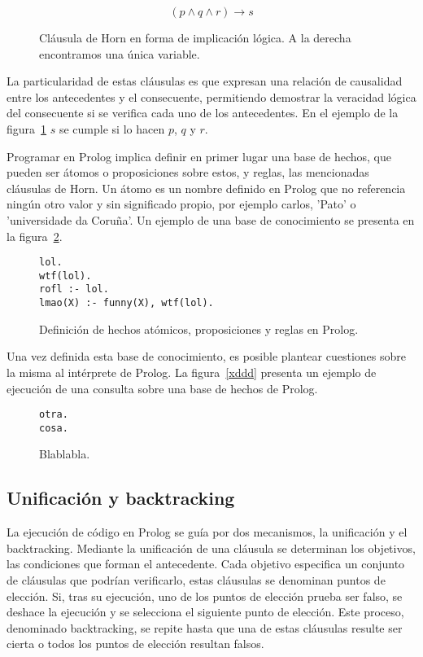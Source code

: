 \documentclass[11pt,captions=nooneline,DIV=14, parskip=full]{scrartcl}
\begin{document}
\begin{figure}[h]
\label{fig:horn}
{\Large{\[ ( p \land q \land r ) \to s \]}}%
\caption{Cláusula de Horn en forma de implicación lógica. A la derecha encontramos una única variable.}
\end{figure}

La particularidad de estas cláusulas es que expresan una relación de causalidad entre los antecedentes y el consecuente, permitiendo demostrar la veracidad lógica del consecuente si se verifica cada uno de los antecedentes. En el ejemplo de la figura~\ref{fig:horn} $ s $ se cumple si lo hacen $ p $, $ q $ y $r $.

Programar en Prolog implica definir en primer lugar una base de hechos, que pueden ser átomos o proposiciones sobre estos, y reglas, las mencionadas cláusulas de Horn. Un átomo es un nombre definido en Prolog que no referencia ningún otro valor y sin significado propio, por ejemplo carlos, 'Pato' o 'universidade da Coruña'. Un ejemplo de una base de conocimiento se presenta en la figura~\ref{fig:knowledge}.

\begin{figure}[h]
\label{fig:knowledge}
\lstset{language=Prolog}
\begin{lstlisting}[frame=single]
lol.
wtf(lol).
rofl :- lol.
lmao(X) :- funny(X), wtf(lol).
\end{lstlisting} 
\caption{Definición de hechos atómicos, proposiciones y reglas en Prolog.}
\end{figure}

Una vez definida esta base de conocimiento, es posible plantear cuestiones sobre la misma al intérprete de Prolog. La figura~\ref{xddd} presenta un ejemplo de ejecución de una consulta sobre una base de hechos de Prolog.

\begin{figure}[h]
\label{fig:xddd}
\lstset{language=Prolog}
\begin{lstlisting}[frame=single]
otra.
cosa.
\end{lstlisting} 
\caption{Blablabla.}
\end{figure}


\subsection{Unificación y backtracking}

La ejecución de código en Prolog se guía por dos mecanismos, la unificación y el backtracking. Mediante la unificación de una cláusula se determinan los objetivos, las condiciones que forman el antecedente. Cada objetivo especifica un conjunto de cláusulas que podrían verificarlo, estas cláusulas se denominan puntos de elección. Si, tras su ejecución, uno de los puntos de elección prueba ser falso, se deshace la ejecución y se selecciona el siguiente punto de elección. Este proceso, denominado backtracking, se repite hasta que una de estas cláusulas resulte ser cierta o todos los puntos de elección resultan falsos.
\end{document}
